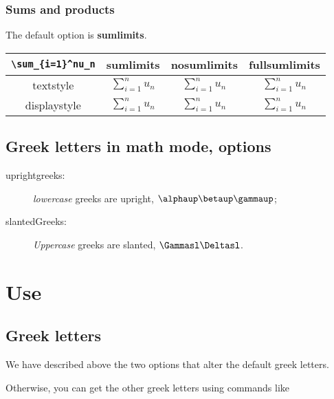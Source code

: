 \documentclass[a4paper,11pt]{christophe}
\renewcommand{\arraystretch}{1.3}
\begin{document}
\renewcommand{\arraystretch}{1.3}

\subsubsection{Sums and products}

The default option is \textbf{sumlimits}.


\renewcommand{\arraystretch}{1.8}

\begin{center}\begin{tabular}{|c||c|c|c|}\hline
\verb+\sum_{i=1}^nu_n+&\textbf{sumlimits}&\textbf{nosumlimits}&\textbf{fullsumlimits}\\\hline\hline
textstyle&$\sum_{i=1}^nu_n$&$\sum_{i=1}^nu_n$&\rule[-3ex]{0pt}{7ex}$\sum\limits_{i=1}^nu_n$\\\hline
displaystyle&$\displaystyle\sum_{i=1}^nu_n$&$\displaystyle\sum\nolimits_{i=1}^nu_n$&\rule[-4ex]{0pt}{9ex}$\displaystyle\sum_{i=1}^nu_n$\\\hline
\end{tabular}\end{center}

\renewcommand{\arraystretch}{1.3}

\subsection{Greek letters in math mode, options}

\begin{description}
	\item[uprightgreeks:] \textit{lowercase} greeks are upright, $\alphaup\betaup\gammaup$;
	\item[slantedGreeks:] \textit{Uppercase} greeks are slanted, $\Gammasl\Deltasl$. 
\end{description}

\section{Use}

\subsection{Greek letters}

We have described above the two options that alter the default greek letters. 

Otherwise, you can get the other greek letters using commands like 
\end{document}
